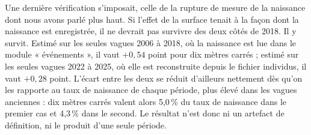 \documentclass[12pt,a4paper]{article}
\begin{document}
\noindent Une dernière vérification s'imposait, celle de la rupture de mesure de la naissance dont nous avons parlé plus haut. Si l'effet de la surface tenait à la façon dont la naissance est enregistrée, il ne devrait pas survivre des deux côtés de 2018. Il y survit. Estimé sur les seules vagues 2006 à 2018, où la naissance est lue dans le module « événements », il vaut $+0{,}54$ point pour dix mètres carrés ; estimé sur les seules vagues 2022 à 2025, où elle est reconstruite depuis le fichier individus, il vaut $+0{,}28$ point. L'écart entre les deux se réduit d'ailleurs nettement dès qu'on les rapporte au taux de naissance de chaque période, plus élevé dans les vagues anciennes : dix mètres carrés valent alors 5,0\,\% du taux de naissance dans le premier cas et 4,3\,\% dans le second. Le résultat n'est donc ni un artefact de définition, ni le produit d'une seule période. \\
\end{document}
